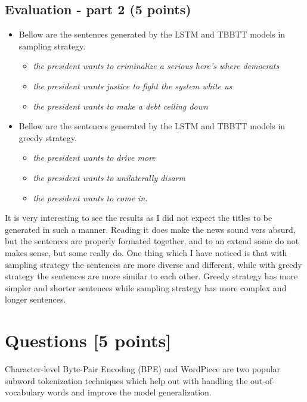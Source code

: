 \documentclass[a4paper]{article}
\begin{document}
\subsection{Evaluation - part 2 (5 points)}
\begin{itemize}
    \item Bellow are the sentences generated by the LSTM and TBBTT models in sampling strategy.
          \begin{itemize}
              \item \textit{the president wants to criminalize a serious here's
                        where democrats}
              \item \textit{the president wants justice to fight the system white us}
              \item \textit{the president wants to make a debt ceiling down}

          \end{itemize}
    \item Bellow are the sentences generated by the LSTM and TBBTT models in greedy strategy.
          \begin{itemize}
              \item \textit{the president wants to drive more}
              \item \textit{the president wants to unilaterally disarm}
              \item \textit{the president wants to come in.}
          \end{itemize}
\end{itemize}

It is very interesting to see the results as I did not expect the titles to be generated in such a manner. Reading it does make the news sound vers absurd, but the sentences are properly formated together, and to an extend some do not makes sense, but some really do. One thing which I have noticed is that with sampling strategy the sentences are more diverse and different, while with greedy strategy the sentences are more similar to each other. Greedy strategy has more simpler and shorter sentences while sampling strategy has more complex and longer sentences.


\section{Questions [5 points]}
Character-level Byte-Pair Encoding (BPE) and WordPiece are two popular subword tokenization techniques which help out with handling the out-of-vocabulary words and improve the model generalization.
\end{document}
